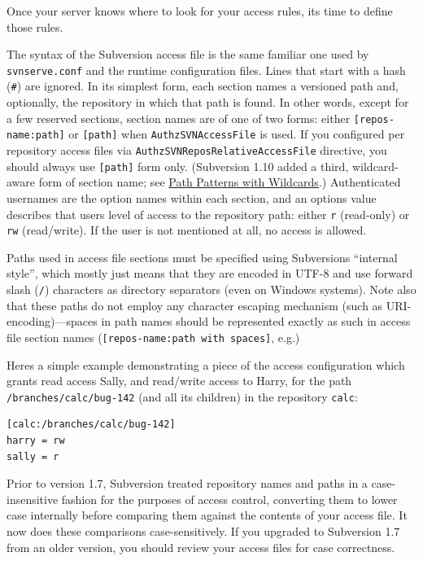 Once your server knows where to look for your access rules,
it\textquotesingle s time to define those rules.

The syntax of the Subversion access file is the same familiar one used
by \texttt{svnserve.conf} and the runtime configuration files. Lines
that start with a hash (\texttt{\#}) are ignored. In its simplest form,
each section names a versioned path and, optionally, the repository in
which that path is found. In other words, except for a few reserved
sections, section names are of one of two forms: either
\texttt{{[}repos-name:path{]}} or \texttt{{[}path{]}} when
\texttt{AuthzSVNAccessFile} is used. If you configured per repository
access files via \texttt{AuthzSVNReposRelativeAccessFile} directive, you
should always use \texttt{{[}path{]}} form only. (Subversion 1.10 added a
third, wildcard-aware form of section name; see
\hyperref[svn.serverconfig.pathbasedauthz.wildcards]{Path Patterns with
Wildcards}.) Authenticated usernames
are the option names within each section, and an
option\textquotesingle s value describes that user\textquotesingle s
level of access to the repository path: either \texttt{r} (read-only) or
\texttt{rw} (read/write). If the user is not mentioned at all, no access
is allowed.

Paths used in access file sections must be specified using
Subversion\textquotesingle s ``internal style'', which mostly just means
that they are encoded in UTF-8 and use forward slash (\texttt{/})
characters as directory separators (even on Windows systems). Note also
that these paths do not employ any character escaping mechanism (such as
URI-encoding)---spaces in path names should be represented exactly as
such in access file section names
(\texttt{{[}repos-name:path\ with\ spaces{]}}, e.g.)

Here\textquotesingle s a simple example demonstrating a piece of the
access configuration which grants read access Sally, and read/write
access to Harry, for the path \texttt{/branches/calc/bug-142} (and all
its children) in the repository \texttt{calc}:

\begin{verbatim}
[calc:/branches/calc/bug-142]
harry = rw
sally = r
\end{verbatim}

Prior to version 1.7, Subversion treated repository names and paths in a
case-insensitive fashion for the purposes of access control, converting
them to lower case internally before comparing them against the contents
of your access file. It now does these comparisons case-sensitively. If
you upgraded to Subversion 1.7 from an older version, you should review
your access files for case correctness.


